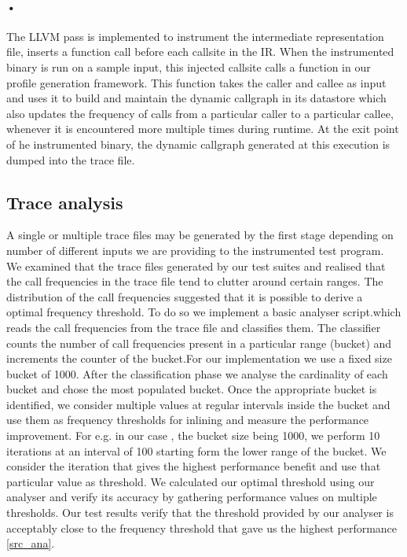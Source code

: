 \documentclass{sigplanconf}
\begin{document}
    \paragraph*{•}
    The LLVM pass is implemented to instrument the intermediate representation file, inserts a function call before each callsite in the IR. When the instrumented binary is run on a sample input, this injected callsite calls a function in our profile generation framework. This function takes the caller and callee as input and uses it to build and maintain the dynamic callgraph in its datastore which also updates the frequency of calls from a particular caller to  a particular callee, whenever it is encountered more multiple times during runtime. At the exit point of he instrumented binary, the dynamic callgraph generated at this execution is dumped into the trace file.
    
    	\subsection{Trace analysis}
	A single or multiple trace files may be gene­­rated by the first stage depending on number of different inputs we are providing to the instrumented test program. We examined that the trace files generated by our test suites and realised that the call frequencies in the trace file tend to clutter around certain ranges. The distribution of the call frequencies suggested that it is possible to derive a optimal frequency threshold. To do so we implement a basic analyser script.which reads the call frequencies from the trace file and classifies them. The classifier counts the number of call frequencies present in a particular range (bucket) and increments the counter of the bucket.For our implementation we use a fixed size bucket of  1000. After the classification phase we analyse the cardinality of each bucket and chose the most populated bucket. Once the appropriate bucket is identified, we consider multiple values at regular intervals inside the bucket and use them as frequency thresholds for inlining and measure the performance improvement. For e.g. in our case , the bucket size being 1000, we perform 10 iterations at an interval of 100 starting form the lower range of the bucket. We consider the iteration that gives the highest performance benefit and use that particular value as threshold.
	We calculated our optimal threshold using our analyser and verify its accuracy by gathering performance values on multiple thresholds. Our test results verify that the threshold provided by our analyser is acceptably close to the frequency threshold that gave us the highest performance \ref{src_ana}.
\end{document}

